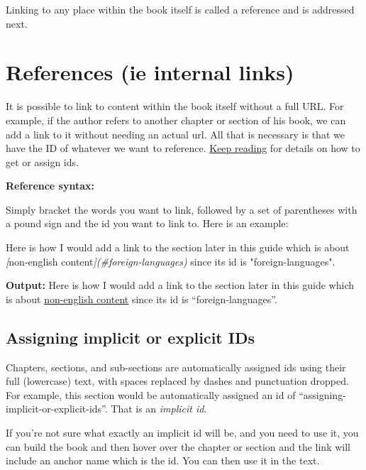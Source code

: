 \documentclass[
]{book}
\newenvironment{Shaded}{\begin{snugshade}}{\end{snugshade}}
\newcommand{\CommentTok}[1]{\textcolor[rgb]{0.56,0.35,0.01}{\textit{#1}}}
\newcommand{\NormalTok}[1]{#1}
\newcommand{\OtherTok}[1]{\textcolor[rgb]{0.56,0.35,0.01}{#1}}
\begin{document}
Linking to any place within the book itself is called a reference and is addressed next.

\hypertarget{references}{%
\section{References (ie internal links)}\label{references}}

It is possible to link to content within the book itself without a full URL. For example, if the author refers to another chapter or section of his book, we can add a link to it without needing an actual url. All that is necessary is that we have the ID of whatever we want to reference. \protect\hyperlink{assigning-ids}{Keep reading} for details on how to get or assign ids.

\textbf{Reference syntax:}

Simply bracket the words you want to link, followed by a set of parentheses with a pound sign and the id you want to link to. Here is an example:

\begin{Shaded}
\begin{Highlighting}[]
\NormalTok{Here is how I would add a link to the section later in this guide which is about }\CommentTok{[}\OtherTok{non{-}english content}\CommentTok{](\#foreign{-}languages)}\NormalTok{ since its id is "foreign{-}languages".}
\end{Highlighting}
\end{Shaded}

\textbf{Output:}
Here is how I would add a link to the section later in this guide which is about \protect\hyperlink{foreign-languages}{non-english content} since its id is ``foreign-languages''.

\hypertarget{assigning-ids}{%
\subsection{Assigning implicit or explicit IDs}\label{assigning-ids}}

Chapters, sections, and sub-sections are automatically assigned ids using their full (lowercase) text, with spaces replaced by dashes and punctuation dropped. For example, this section would be automatically assigned an id of ``assigning-implicit-or-explicit-ids''. That is an \emph{implicit id}.

If you're not sure what exactly an implicit id will be, and you need to use it, you can build the book and then hover over the chapter or section and the link will include an anchor name which is the id. You can then use it in the text.
\end{document}
